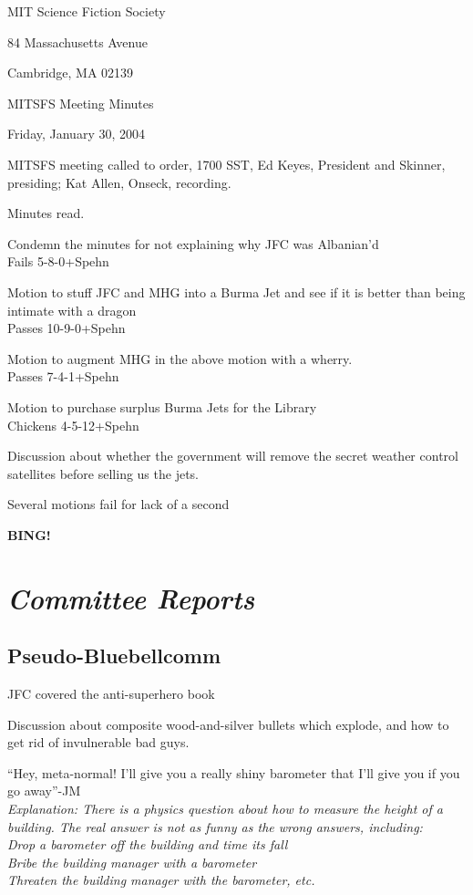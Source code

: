\documentclass[10pt]{article}
\newcommand{\bing}{{\bf BING!} }
\newcommand{\goto}[1]{\bing \vskip 12pt \section*{{\em{#1}}}}
\begin{document}
\begin{center}

MIT Science Fiction Society 

84 Massachusetts Avenue

Cambridge, MA 02139

\vspace{12pt}

MITSFS Meeting Minutes 

Friday, January 30, 2004
\end{center}
 
\vspace{18pt}

\setlength{\parskip}{6pt}

\noindent
MITSFS meeting called to order, 1700 SST, Ed Keyes, President and
Skinner, presiding; Kat Allen,  Onseck, recording.

Minutes read.

Condemn the minutes for not explaining why JFC was Albanian'd\\
Fails 5-8-0+Spehn

Motion to stuff JFC and MHG into a Burma Jet and see if it is better
than being intimate with a dragon\\
Passes 10-9-0+Spehn

Motion to augment MHG in the above motion with a wherry.\\
Passes 7-4-1+Spehn

Motion to purchase surplus Burma Jets for the Library\\
Chickens 4-5-12+Spehn

Discussion about whether the government will remove the secret weather
control satellites before selling us the jets.

Several motions fail for lack of a second

\goto{Committee Reports}
\subsection*{Pseudo-Bluebellcomm }
JFC covered the anti-superhero book

Discussion about composite wood-and-silver bullets which explode, and
how to get rid of invulnerable bad guys.

``Hey, meta-normal! I'll give you a really shiny barometer that I'll
give you if you go away''-JM\\
\emph{Explanation: There is a physics question about how to measure the
height of a building.  The real answer is not as funny as the wrong
answers, including:\\
Drop a barometer off the building and time its fall\\
Bribe the building manager with a barometer\\
Threaten the building manager with the barometer, etc.}
\end{document}
